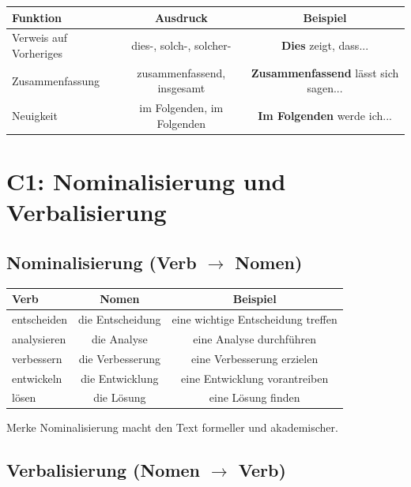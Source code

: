 \begin{center}
\begin{tabular}{|l|c|c|}
\hline
Funktion & Ausdruck & Beispiel \\ \hline
Verweis auf Vorheriges & dies-, solch-, solcher- & \textbf{Dies} zeigt, dass... \\ \hline
Zusammenfassung & zusammenfassend, insgesamt & \textbf{Zusammenfassend} lässt sich sagen... \\ \hline
Neuigkeit & im Folgenden, im Folgenden & \textbf{Im Folgenden} werde ich... \\ \hline
\end{tabular}
\end{center}

\chapterend

\chapter{C1: Nominalisierung und Verbalisierung}
\label{cha:C1Nominalisierung}

\section{Nominalisierung (Verb $\rightarrow$ Nomen)}
\label{sec:C1Nominalisierung}

\begin{center}
\begin{tabular}{|l|c|c|}
\hline
Verb & Nomen & Beispiel \\ \hline
entscheiden & die Entscheidung & eine wichtige Entscheidung treffen \\ \hline
analysieren & die Analyse & eine Analyse durchführen \\ \hline
verbessern & die Verbesserung & eine Verbesserung erzielen \\ \hline
entwickeln & die Entwicklung & eine Entwicklung vorantreiben \\ \hline
lösen & die Lösung & eine Lösung finden \\ \hline
\end{tabular}
\end{center}

\begin{infobox}{Merke}
Nominalisierung macht den Text formeller und akademischer.
\end{infobox}

\section{Verbalisierung (Nomen $\rightarrow$ Verb)}
\label{sec:C1Verbalisierung}

